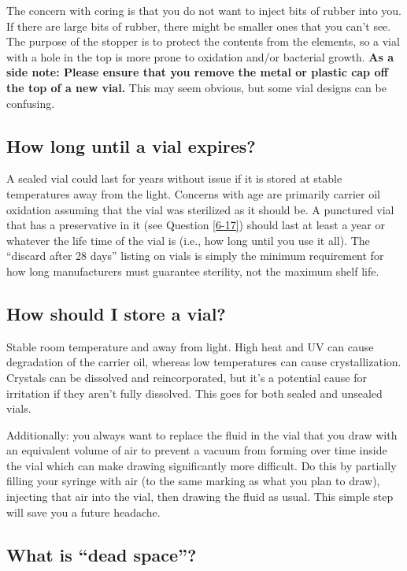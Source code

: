 \documentclass{article}
\begin{document}
The concern with coring is that you do not want to inject bits of rubber into you. If there are large bits of rubber, there might be smaller ones that you can't see. The purpose of the stopper is to protect the contents from the elements, so a vial with a hole in the top is more prone to oxidation and/or bacterial growth. \textbf{As a side note: Please ensure that you remove the metal or plastic cap off the top of a new vial.} This may seem obvious, but some vial designs can be confusing.

\subsection{How long until a vial expires?}

A sealed vial could last for years without issue if it is stored at stable temperatures away from the light. Concerns with age are primarily carrier oil oxidation assuming that the vial was sterilized as it should be. A punctured vial that has a preservative in it (see Question \ref{6-17}) should last at least a year or whatever the life time of the vial is (i.e., how long until you use it all). The “discard after 28 days” listing on vials is simply the minimum requirement for how long manufacturers must guarantee sterility, not the maximum shelf life.

\subsection{How should I store a vial?}\label{5-25}

Stable room temperature and away from light. High heat and UV can cause degradation of the carrier oil, whereas low temperatures can cause crystallization. Crystals can be dissolved and reincorporated, but it’s a potential cause for irritation if they aren’t fully dissolved. This goes for both sealed and unsealed vials.

Additionally: you always want to replace the fluid in the vial that you draw with an equivalent volume of air to prevent a vacuum from forming over time inside the vial which can make drawing significantly more difficult. Do this by partially filling your syringe with air (to the same marking as what you plan to draw), injecting that air into the vial, then drawing the fluid as usual. This simple step will save you a future headache.

\subsection{What is “dead space”?}\label{5-26}
\end{document}
